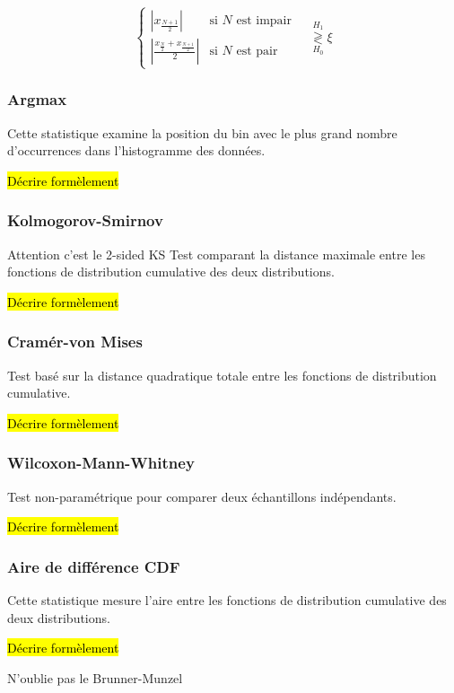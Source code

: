 \documentclass{article}
\newcommand{\dm}[1]{{\color{mulberry} #1}}
\begin{document}
\begin{equation}
\begin{cases}
\left| x_{\frac{N+1}{2}} \right| & \text{si }N\text{ est impair} \\
\left| \frac{x_{\frac{N}{2}} + x_{\frac{N+1}{2}}}{2} \right|  & \text{si }N\text{ est pair}
\end{cases}
\quad\stackrel{H_1}{\underset{H_0}{\gtrless}} \xi
\end{equation}

\subsubsection{Argmax}
Cette statistique examine la position du bin avec le plus grand nombre d'occurrences dans l'histogramme des données.

\hl{Décrire formèlement}

\subsubsection{Kolmogorov-Smirnov}
\dm{Attention c'est le 2-sided KS}
Test comparant la distance maximale entre les fonctions de distribution cumulative des deux distributions.

\hl{Décrire formèlement}

\subsubsection{Cramér-von Mises}
Test basé sur la distance quadratique totale entre les fonctions de distribution cumulative.

\hl{Décrire formèlement}

\subsubsection{Wilcoxon-Mann-Whitney}
Test non-paramétrique pour comparer deux échantillons indépendants.

\hl{Décrire formèlement}

\subsubsection{Aire de différence CDF}
Cette statistique mesure l'aire entre les fonctions de distribution cumulative des deux distributions.

\hl{Décrire formèlement}

\dm{N'oublie pas le Brunner-Munzel}
\end{document}
